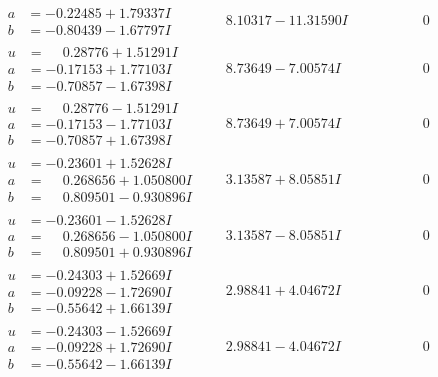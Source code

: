 \documentclass[1p]{elsarticle_modified}
\theoremstyle{definition}
\begin{document}
$$\begin{array}{c|c|c}
\begin{aligned}
a &= -0.22485 + 1.79337 I \\
b &= -0.80439 - 1.67797 I\end{aligned}
 & \phantom{-}8.10317 - 11.31590 I & \phantom{-0.000000 } 0 \\ \hline\begin{aligned}
u &= \phantom{-}0.28776 + 1.51291 I \\
a &= -0.17153 + 1.77103 I \\
b &= -0.70857 - 1.67398 I\end{aligned}
 & \phantom{-}8.73649 - 7.00574 I & \phantom{-0.000000 } 0 \\ \hline\begin{aligned}
u &= \phantom{-}0.28776 - 1.51291 I \\
a &= -0.17153 - 1.77103 I \\
b &= -0.70857 + 1.67398 I\end{aligned}
 & \phantom{-}8.73649 + 7.00574 I & \phantom{-0.000000 } 0 \\ \hline\begin{aligned}
u &= -0.23601 + 1.52628 I \\
a &= \phantom{-}0.268656 + 1.050800 I \\
b &= \phantom{-}0.809501 - 0.930896 I\end{aligned}
 & \phantom{-}3.13587 + 8.05851 I & \phantom{-0.000000 } 0 \\ \hline\begin{aligned}
u &= -0.23601 - 1.52628 I \\
a &= \phantom{-}0.268656 - 1.050800 I \\
b &= \phantom{-}0.809501 + 0.930896 I\end{aligned}
 & \phantom{-}3.13587 - 8.05851 I & \phantom{-0.000000 } 0 \\ \hline\begin{aligned}
u &= -0.24303 + 1.52669 I \\
a &= -0.09228 - 1.72690 I \\
b &= -0.55642 + 1.66139 I\end{aligned}
 & \phantom{-}2.98841 + 4.04672 I & \phantom{-0.000000 } 0 \\ \hline\begin{aligned}
u &= -0.24303 - 1.52669 I \\
a &= -0.09228 + 1.72690 I \\
b &= -0.55642 - 1.66139 I\end{aligned}
 & \phantom{-}2.98841 - 4.04672 I & \phantom{-0.000000 } 0 \\ \hline\begin{aligned}

\end{aligned}
\end{array}$$
\end{document}
